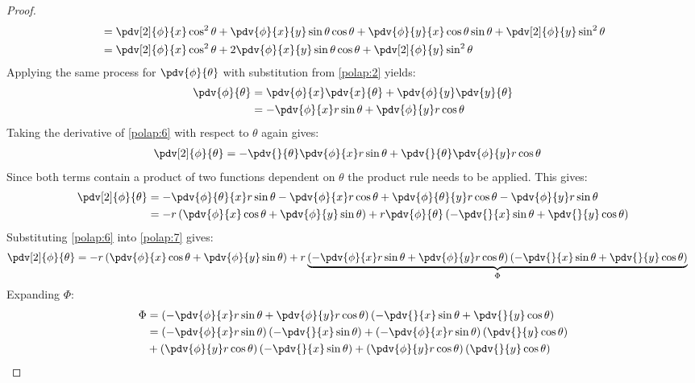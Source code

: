 \begin{proof}
\begin{align}
		\notag&=\pdv[2]{\phi}{x}\cos^2\theta+\pdv{\phi}{x}{y}\sin\theta\cos\theta+\pdv{\phi}{y}{x}\cos\theta\sin\theta+\pdv[2]{\phi}{y}\sin^2\theta\\
		\label{polap:5}&=\pdv[2]{\phi}{x}\cos^2\theta+2\pdv{\phi}{x}{y}\sin\theta\cos\theta+\pdv[2]{\phi}{y}\sin^2\theta
	\end{align}
	Applying the same process for $\pdv{\phi}{\theta}$ with substitution from \ref{polap:2} yields:
	\begin{align}
		\notag\pdv{\phi}{\theta}&=\pdv{\phi}{x}\pdv{x}{\theta}+\pdv{\phi}{y}\pdv{y}{\theta}\\
		\label{polap:6}&=-\pdv{\phi}{x}r\sin\theta+\pdv{\phi}{y}r\cos\theta
	\end{align}
	Taking the derivative of \ref{polap:6} with respect to $\theta$ again gives:
	\begin{align}
		\notag\pdv[2]{\phi}{\theta}&=-\pdv{}{\theta}\pdv{\phi}{x}r\sin\theta+\pdv{}{\theta}\pdv{\phi}{y}r\cos\theta
	\end{align}
	Since both terms contain a product of two functions dependent on $\theta$ the product rule needs to be applied. This gives:
	\begin{align}
		\notag\pdv[2]{\phi}{\theta}&=-\pdv{\phi}{\theta}{x}r\sin\theta-\pdv{\phi}{x}r\cos\theta+\pdv{\phi}{\theta}{y}r\cos\theta-\pdv{\phi}{y}r\sin\theta\\
		\label{polap:7}&=-r\left(\pdv{\phi}{x}\cos\theta+\pdv{\phi}{y}\sin\theta\right)+r\pdv{\phi}{\theta}\left(-\pdv{}{x}\sin\theta+\pdv{}{y}\cos\theta\right)
	\end{align}
	Substituting \ref{polap:6} into \ref{polap:7} gives:
	\begin{align}
		\label{polap:8}\pdv[2]{\phi}{\theta}&=-r\left(\pdv{\phi}{x}\cos\theta+\pdv{\phi}{y}\sin\theta\right)+r\underbrace{\left(-\pdv{\phi}{x}r\sin\theta+\pdv{\phi}{y}r\cos\theta\right)\left(-\pdv{}{x}\sin\theta+\pdv{}{y}\cos\theta\right)}_{\Phi}
	\end{align}
	Expanding $\Phi$:
	\begin{align}
		\notag\Phi&=\left(-\pdv{\phi}{x}r\sin\theta+\pdv{\phi}{y}r\cos\theta\right)\left(-\pdv{}{x}\sin\theta+\pdv{}{y}\cos\theta\right)\\
		\notag&=\left(-\pdv{\phi}{x}r\sin\theta\right)\left(-\pdv{}{x}\sin\theta\right)+\left(-\pdv{\phi}{x}r\sin\theta\right)\left(\pdv{}{y}\cos\theta\right)\\
		\notag&+\left(\pdv{\phi}{y}r\cos\theta\right)\left(-\pdv{}{x}\sin\theta\right)+\left(\pdv{\phi}{y}r\cos\theta\right)\left(\pdv{}{y}\cos\theta\right)\\

\end{align}
\end{proof}

